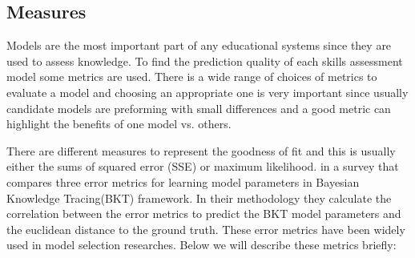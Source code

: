 \subsection{Measures}

Models are the most important part of any educational systems since they are used to assess knowledge. To find the prediction quality of each skills assessment model some metrics are used. There is a wide range of choices of metrics to evaluate a model and choosing an appropriate one is very important since usually candidate models are preforming with small differences and a good metric can highlight the benefits of one model vs. others.



There are different measures to represent the goodness of fit and this is usually either the sums of squared error (SSE) or maximum likelihood. \citet{Dhanani:EECS-2014-131} in a survey that compares three error metrics for learning model parameters in Bayesian Knowledge Tracing(BKT) framework. In their methodology they calculate the correlation between the error metrics to predict the BKT model parameters and the euclidean distance to the ground truth.  These error metrics have been widely used in model selection researches. Below we will describe these metrics briefly:


